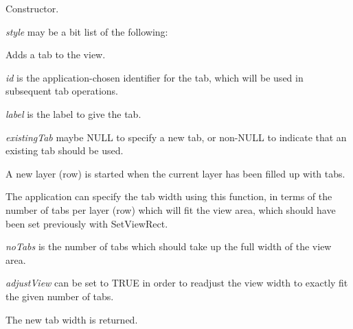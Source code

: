 


Constructor.

{\it style} may be a bit list of the following:

\begin{twocollist}\itemsep=0pt
\end{twocollist}

\label{wxtabviewaddtab}


Adds a tab to the view.

{\it id} is the application-chosen identifier for the tab, which will be used in subsequent tab operations.

{\it label} is the label to give the tab.

{\it existingTab} maybe NULL to specify a new tab, or non-NULL to indicate that an existing tab should be used.

A new layer (row) is started when the current layer has been filled up with tabs.

\label{wxtabviewcalculatetabwidth}


The application can specify the tab width using this function, in terms
of the number of tabs per layer (row) which will fit the view area, which
should have been set previously with SetViewRect.

{\it noTabs} is the number of tabs which should take up the full width
of the view area.

{\it adjustView} can be set to TRUE in order to readjust the view width
to exactly fit the given number of tabs. 

The new tab width is returned.


